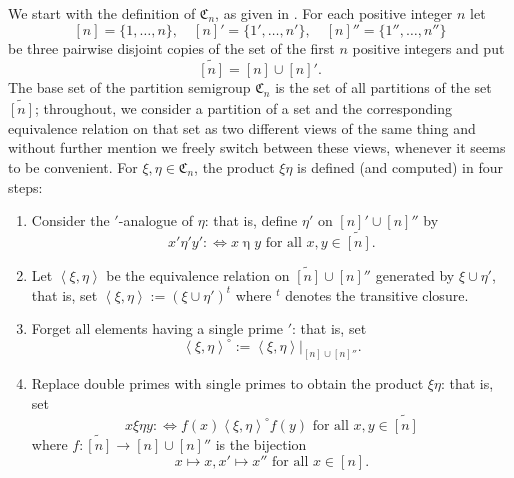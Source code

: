 \documentclass[preprint,1p,times]{elsarticle}
\numberwithin{equation}{section}
\theoremstyle{remark}
\def\C{\mathfrak{C}}
\begin{document}
We start with the definition of $\C_n$, as given in \cite{Wil}. For each positive integer $n$ let
$$[n]=\{1,\dots,n\},\quad [n]'=\{1',\dots,n'\},\quad [n]''=\{1'',\dots,n''\}$$
be three pairwise disjoint copies of the set of the first $n$ positive integers and put
$$\widetilde{[n]}=[n]\cup [n]'.$$
The base set of the partition semigroup $\C_n$ is the set of all partitions of the set $\widetilde{[n]}$; throughout, we
consider a partition of a set and the corresponding equivalence relation on that set as two different views of the same
thing and without further mention we freely switch between these views, whenever it seems to be convenient. For
$\xi,\eta\in \C_n$, the product $\xi\eta$ is defined (and computed) in four steps:
\begin{enumerate}
\item Consider the $'$-analogue of $\eta$: that is, define $\eta'$
on ${[n]'}\cup {[n]''}$ by
$${x'}\mathrel{\eta'}{y'}:\Leftrightarrow x\mathrel{\eta}
y\text{ for all } x,y\in \widetilde{[n]}.$$
\item Let $\left<\xi,\eta\right>$ be the equivalence relation on
$\widetilde{[n]}\cup {[n]''}$ generated by $\xi\cup {\eta'}$, that is, set $\left<\xi,\eta\right>:=(\xi\cup {\eta'})^t$
where $^t$ denotes the transitive closure.
\item Forget all elements having a single prime $'$: that is, set
$$\left<\xi,\eta\right>^\circ:=\left<\xi,\eta\right>|_{[n]\cup{[n]''}}.$$
\item Replace  double primes with single primes to
obtain the product $\xi\eta$: that is, set
$$x\mathrel{\xi\eta}y:\Leftrightarrow f(x)\mathrel{\left<\xi,\eta\right>^\circ}f(y)
\text{ for all }x,y\in \widetilde{[n]}$$ where $f:\widetilde{[n]}\to [n]\cup{[n]''}$ is the bijection
$$x\mapsto x, x'\mapsto x'' \text{ for all } x\in [n].$$
\end{enumerate}
\end{document}
